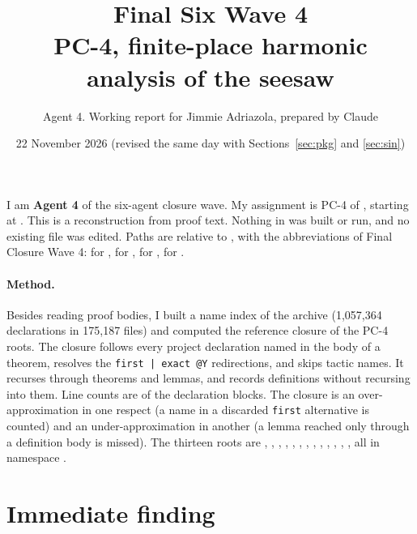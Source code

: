 \documentclass[11pt]{article}
\title{Final Six Wave 4\\ PC-4, finite-place harmonic analysis of the seesaw}
\author{Agent 4. Working report for Jimmie Adriazola, prepared by Claude}
\date{22 November 2026 (revised the same day with Sections~\ref{sec:pkg} and \ref{sec:sin})}
\begin{document}
\maketitle

\noindent I am \textbf{Agent 4} of the six-agent closure wave. My assignment is PC-4 of , starting at . This is a reconstruction from proof text. Nothing in  was built or run, and no existing file was edited. Paths are relative to , with the abbreviations of Final Closure Wave 4:  for ,  for ,  for ,  for .

\paragraph{Method.} Besides reading proof bodies, I built a name index of the archive (1{,}057{,}364 declarations in 175{,}187 files) and computed the reference closure of the PC-4 roots. The closure follows every project declaration named in the body of a theorem, resolves the \texttt{first | exact @Y} redirections, and skips tactic names. It recurses through theorems and lemmas, and records definitions without recursing into them. Line counts are of the declaration blocks. The closure is an over-approximation in one respect (a name in a discarded \texttt{first} alternative is counted) and an under-approximation in another (a lemma reached only through a definition body is missed). The thirteen roots are , , , , , , , , , , , , , all in namespace .

\section{Immediate finding}\label{sec:flag}
\end{document}
